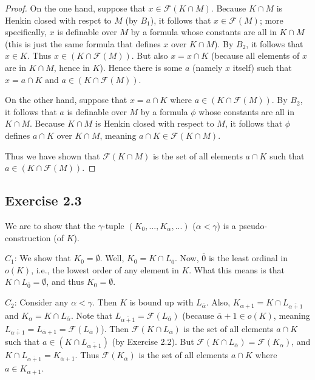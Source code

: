 \documentclass{article}
\theoremstyle{definition}
\begin{document}
\begin{proof}

On the one hand, suppose that $x\in\mathcal{F}(K\cap M)$. Because $K\cap M$ is Henkin closed with respct to $M$ (by $B_1$), it follows that 
$x\in\mathcal{F}(M)$; more specifically, $x$ is definable over $M$ by a formula whose constants are all in $K\cap M$ (this is just the same 
formula that defines $x$ over $K\cap M$). By $B_2$, it follows that $x\in K$. Thus $x\in (K\cap\mathcal{F}(M))$. 
But also $x=x\cap K$ (because all elements of $x$ are in $K\cap M$, hence in $K$). Hence there is some $a$ (namely $x$ itself) such that 
$x=a\cap K$ and $a\in (K\cap\mathcal{F}(M))$.

On the other hand, suppose that $x=a\cap K$ where $a\in (K\cap\mathcal{F}(M))$. By $B_2$, it follows that $a$ is definable over 
$M$ by a formula $\phi$ whose constants are all in $K\cap M$. Because $K\cap M$ is Henkin closed with respect to $M$, it follows that 
$\phi$ defines $a\cap K$ over $K\cap M$, meaning $a\cap K\in\mathcal{F}(K\cap M)$. 

Thus we have shown that $\mathcal{F}(K\cap M)$ is the set of all elements $a\cap K$ such that $a\in (K\cap\mathcal{F}(M))$.

\end{proof}

\subsection*{Exercise 2.3}
We are to show that the $\gamma$-tuple $(K_0,...,K_\alpha,...)$ ($\alpha<\gamma$) is a pseudo-construction (of $K$).

$C_1$: We show that $K_0=\emptyset$. Well, $K_0=K\cap L_{\overline{0}}$. Now, $\overline{0}$ is the least ordinal in $o(K)$, i.e., the lowest order of 
any element in $K$. What this means is that $K\cap L_{\overline{0}}=\emptyset$, and thus $K_0=\emptyset$.

$C_2$: Consider any $\alpha<\gamma$. Then $K$ is bound up with $L_{\overline{\alpha}}$. Also, 
$K_{\alpha+1}=K\cap L_{\overline{\alpha+1}}$ and $K_\alpha=K\cap L_{\overline{\alpha}}$. Note that 
$L_{\overline{\alpha+1}}=\mathcal{F}(L_{\overline{\alpha}})$ (because $\overline{\alpha}+1\in o(K)$, meaning 
$L_{\overline{\alpha+1}}=L_{\overline{\alpha}+1}=\mathcal{F}(L_{\overline{\alpha}})$). Then 
$\mathcal{F}(K\cap L_{\overline{\alpha}})$ is the set of all elements $a\cap K$ such that $a\in (K\cap L_{\overline{\alpha+1}})$ (by Exercise 2.2).
But $\mathcal{F}(K\cap L_{\overline{\alpha}})=\mathcal{F}(K_\alpha)$, and 
$K\cap L_{\overline{\alpha+1}}=K_{\alpha+1}$. Thus $\mathcal{F}(K_\alpha)$ is the set of all elements $a\cap K$ where 
$a\in K_{\alpha+1}$. 
\end{document}
